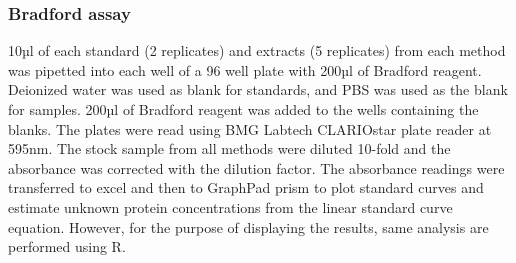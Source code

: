 \documentclass[
  letterpaper,
  DIV=11,
  numbers=noendperiod]{scrreprt}
\begin{document}
\subsubsection{\texorpdfstring{\textbf{Bradford
assay}}{Bradford assay}}\label{bradford-assay}

10µl of each standard (2 replicates) and extracts (5 replicates) from
each method was pipetted into each well of a 96 well plate with 200µl of
Bradford reagent. Deionized water was used as blank for standards, and
PBS was used as the blank for samples. 200µl of Bradford reagent was
added to the wells containing the blanks. The plates were read using BMG
Labtech CLARIOstar plate reader at 595nm. The stock sample from all
methods were diluted 10-fold and the absorbance was corrected with the
dilution factor. The absorbance readings were transferred to excel and
then to GraphPad prism to plot standard curves and estimate unknown
protein concentrations from the linear standard curve equation. However,
for the purpose of displaying the results, same analysis are performed
using R.
\end{document}
